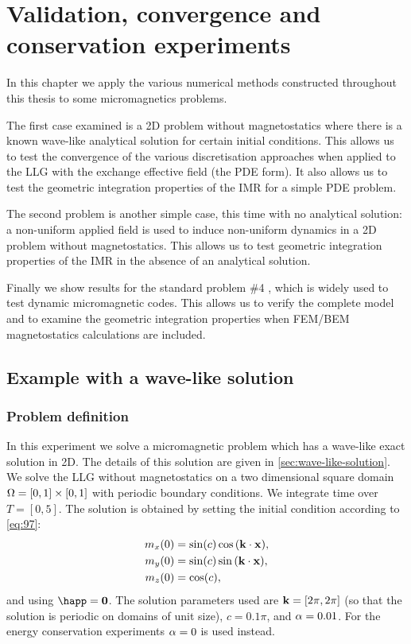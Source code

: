 \chapter{Validation, convergence and conservation experiments}
\label{cha:numer-experiments}

In this chapter we apply the various numerical methods constructed throughout this thesis to some micromagnetics problems.

The first case examined is a 2D problem without magnetostatics where there is a known wave-like analytical solution for certain initial conditions.
This allows us to test the convergence of the various discretisation approaches when applied to the LLG with the exchange effective field (\ie the PDE form).
It also allows us to test the geometric integration properties of the IMR for a simple PDE problem.

The second problem is another simple case, this time with no analytical solution: a non-uniform applied field is used to induce non-uniform dynamics in a 2D problem without magnetostatics.
This allows us to test geometric integration properties of the IMR in the absence of an analytical solution.

Finally we show results for the \mumag standard problem \#4 \cite{mumag-website}, which is widely used to test dynamic micromagnetic codes.
This allows us to verify the complete model and to examine the geometric integration properties when FEM/BEM magnetostatics calculations are included.


\section{Example with a wave-like solution}
\label{sec:numer-exper}

\subsection{Problem definition}
\label{sec:wave-problem-definition}

In this experiment we solve a micromagnetic problem which has a wave-like exact solution in 2D.
The details of this solution are given in \cref{sec:wave-like-solution}.
We solve the LLG without magnetostatics on a two dimensional square domain $\Omega = [0,1] \times [0,1]$ with periodic boundary conditions.
We integrate time over $T = [0, 5]$.
The solution is obtained by setting the initial condition according to \cref{eq:97}:
\begin{equation}
  \begin{aligned}
    m_x(0) &= \sin(c) \cos{\left( \boldsymbol{\mathrm{k}}\cdot \boldsymbol{\mathrm{x}}\right)}, \\
    m_y(0) &= \sin(c) \sin{\left( \boldsymbol{\mathrm{k}}\cdot \boldsymbol{\mathrm{x}}\right)}, \\
    m_z(0) &= \cos(c),
  \end{aligned}
\end{equation}
and using $\happ = \zerov$.
The solution parameters used are $\boldsymbol{\mathrm{k}} = [2\pi, 2\pi]$ (so that the solution is periodic on domains of unit size), $c = 0.1\pi$, and $\alpha = 0.01$.
For the energy conservation experiments $\alpha = 0$ is used instead.

